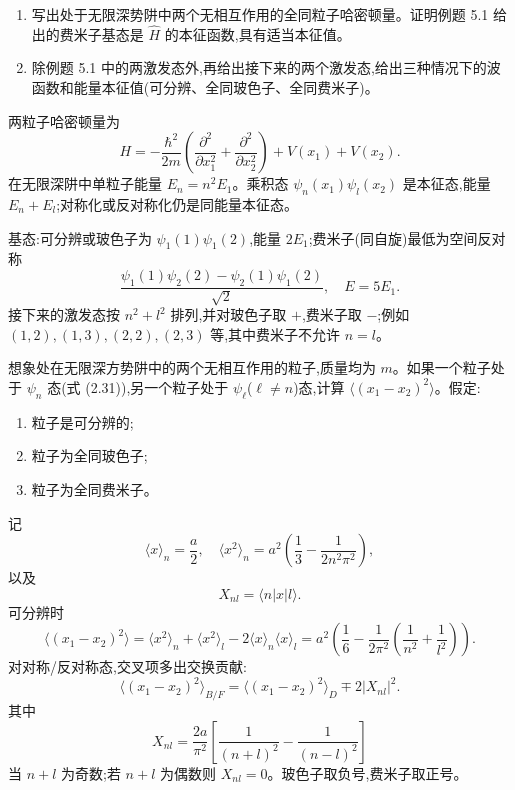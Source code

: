 \begin{question}
\begin{enumerate}
\item 写出处于无限深势阱中两个无相互作用的全同粒子哈密顿量。证明例题 5.1 给出的费米子基态是 $\hat H$ 的本征函数,具有适当本征值。
\item 除例题 5.1 中的两激发态外,再给出接下来的两个激发态,给出三种情况下的波函数和能量本征值(可分辨、全同玻色子、全同费米子)。
\end{enumerate}
\begin{solution}

两粒子哈密顿量为
\[
H=-\frac{\hbar^2}{2m}\left(\frac{\partial^2}{\partial x_1^2}+\frac{\partial^2}{\partial x_2^2}\right)+V(x_1)+V(x_2).
\]
在无限深阱中单粒子能量 $E_n=n^2E_1$。乘积态 $\psi_n(x_1)\psi_l(x_2)$ 是本征态,能量 $E_n+E_l$;对称化或反对称化仍是同能量本征态。

基态:可分辨或玻色子为 $\psi_1(1)\psi_1(2)$,能量 $2E_1$;费米子(同自旋)最低为空间反对称
\[
\frac{\psi_1(1)\psi_2(2)-\psi_2(1)\psi_1(2)}{\sqrt2},
\quad E=5E_1.
\]
接下来的激发态按 $n^2+l^2$ 排列,并对玻色子取 $+$,费米子取 $-$;例如 $(1,2),(1,3),(2,2),(2,3)$ 等,其中费米子不允许 $n=l$。

\end{solution}
\end{question}

\begin{question}
想象处在无限深方势阱中的两个无相互作用的粒子,质量均为 $m$。如果一个粒子处于 $\psi_n$ 态(式 (2.31)),另一个粒子处于 $\psi_\ell$($\ell\ne n$)态,计算 $\langle (x_1-x_2)^2\rangle$。假定:
\begin{enumerate}
\item 粒子是可分辨的;
\item 粒子为全同玻色子;
\item 粒子为全同费米子。
\end{enumerate}

\par\smallskip
{}

\begin{solution}

记
\[
\langle x\rangle_n=\frac a2,
\quad
\langle x^2\rangle_n=a^2\left(\frac13-\frac{1}{2n^2\pi^2}\right),
\]
以及
\[
X_{nl}=\langle n|x|l\rangle.
\]
可分辨时
\[
\langle(x_1-x_2)^2\rangle=\langle x^2\rangle_n+\langle x^2\rangle_l-2\langle x\rangle_n\langle x\rangle_l
=a^2\left(\frac16-\frac{1}{2\pi^2}\left(\frac1{n^2}+\frac1{l^2}\right)\right).
\]
对对称/反对称态,交叉项多出交换贡献:
\[
\langle(x_1-x_2)^2\rangle_{B/F}=\langle(x_1-x_2)^2\rangle_{D}
\mp 2|X_{nl}|^2.
\]
其中
\[
X_{nl}=\frac{2a}{\pi^2}\left[\frac{1}{(n+l)^2}-\frac{1}{(n-l)^2}\right]
\]
当 $n+l$ 为奇数;若 $n+l$ 为偶数则 $X_{nl}=0$。玻色子取负号,费米子取正号。

\end{solution}
\end{question}

